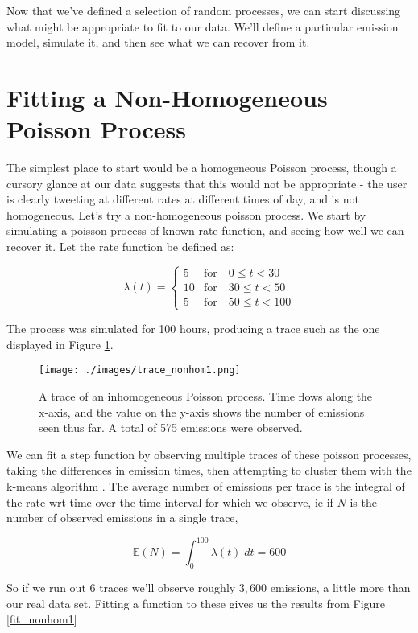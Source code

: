 Now that we've defined a selection of random processes, we can start discussing what might be appropriate to fit to our data. We'll define a particular emission model, simulate it, and then see what we can recover from it.

\section{Fitting a Non-Homogeneous Poisson Process}

The simplest place to start would be a homogeneous Poisson process, though a cursory glance at our data suggests that this would not be appropriate - the user is clearly tweeting at different rates at different times of day, and is not homogeneous. Let's try a non-homogeneous poisson process. We start by simulating a poisson process of known rate function, and seeing how well we can recover it. Let the rate function be defined as:

$$
\lambda(t) = 
\begin{cases}
5  & \mbox{for} \quad 0  \leqslant t < 30\\
10 & \mbox{for} \quad 30 \leqslant t < 50\\
5  & \mbox{for} \quad 50 \leqslant t < 100
\end{cases}
$$

The process was simulated for 100 hours, producing a trace such as the one displayed in Figure \ref{trace_nonhom1}.

\begin{figure}[h]
\texttt{[image: ./images/trace\_nonhom1.png]}
\caption{A trace of an inhomogeneous Poisson process. Time flows along the x-axis, and the value on the y-axis shows the number of emissions seen thus far. A total of 575 emissions were observed.}
\label{trace_nonhom1}
\end{figure}

We can fit a step function by observing multiple traces of these poisson processes, taking the differences in emission times, then attempting to cluster them with the k-means algorithm \cite{kmeans}. The average number of emissions per trace is the integral of the rate wrt time over the time interval for which we observe, ie if $N$ is the number of observed emissions in a single trace,

$$
\mathbb{E}(N) = \int^{100}_0 \lambda(t) \; dt = 600
$$

So if we run out 6 traces we'll observe roughly $3,600$ emissions, a little more than our real data set. Fitting a function to these gives us the results from Figure \ref{fit_nonhom1}

